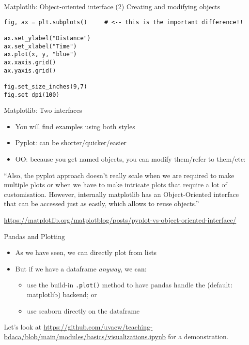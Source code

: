 \begin{frame}[fragile]{Matplotlib: Object-oriented interface}
(2) Creating and modifying objects
\begin{verbatim}
fig, ax = plt.subplots()     # <-- this is the important difference!!

ax.set_ylabel("Distance")
ax.set_xlabel("Time")
ax.plot(x, y, "blue")
ax.xaxis.grid()
ax.yaxis.grid()

fig.set_size_inches(9,7)
fig.set_dpi(100)
\end{verbatim}

\end{frame}



\begin{frame}{Matplotlib: Two interfaces}
  \begin{itemize}
  \item You will find examples using both styles
  \item Pyplot: can be shorter/quicker/easier
  \item OO: because you get named objects, you can modify them/refer to them/etc:
  \end{itemize}

  \pause

  ``Also, the pyplot approach doesn't really scale when we are required to make multiple plots or when we have to make intricate plots that require a lot of customisation. However, internally matplotlib has an Object-Oriented interface that can be accessed just as easily, which allows to reuse objects.''

  \tiny \url{https://matplotlib.org/matplotblog/posts/pyplot-vs-object-oriented-interface/}
  
\end{frame}


\begin{frame}{Pandas and Plotting}
  \begin{itemize}
  \item As we have seen, we can directly plot from lists
  \item But if we have a dataframe \emph{anyway}, we can:
    \begin{itemize}
    \item use the build-in \texttt{.plot()} method to have pandas handle the (default: matplotlib) backend; or
    \item use seaborn directly on the dataframe
    \end{itemize}
  \end{itemize}
\end{frame}

\begin{frame}[standout]
Let's look at \url{https://github.com/uvacw/teaching-bdaca/blob/main/modules/basics/visualizations.ipynb} for a demonstration.
\end{frame}
